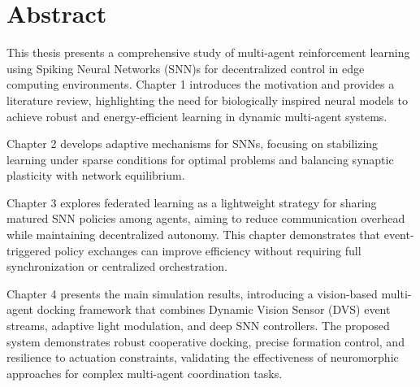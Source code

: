 \chapter*{Abstract}

This thesis presents a comprehensive study of multi-agent reinforcement learning using Spiking Neural Networks (SNN)s for decentralized control in edge computing environments. Chapter 1 introduces the motivation and provides a literature review, highlighting the need for biologically inspired neural models to achieve robust and energy-efficient learning in dynamic multi-agent systems. 

Chapter 2 develops adaptive mechanisms for SNNs, focusing on stabilizing learning under sparse conditions for optimal problems and balancing synaptic plasticity with network equilibrium. 

Chapter 3 explores federated learning as a lightweight strategy for sharing matured SNN policies among agents, aiming to reduce communication overhead while maintaining decentralized autonomy. This chapter demonstrates that event-triggered policy exchanges can improve efficiency without requiring full synchronization or centralized orchestration.

Chapter 4 presents the main simulation results, introducing a vision-based multi-agent docking framework that combines Dynamic Vision Sensor (DVS) event streams, adaptive light modulation, and deep SNN controllers. The proposed system demonstrates robust cooperative docking, precise formation control, and resilience to actuation constraints, validating the effectiveness of neuromorphic approaches for complex multi-agent coordination tasks.

